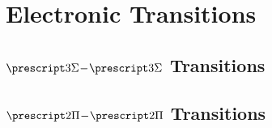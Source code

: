 \chapter{Electronic Transitions}
\label{c:electronic_transitions}

\section{\texorpdfstring{$\state{3}{\Sigma}\dash\state{3}{\Sigma}$}{3Σ-3Σ} Transitions}
\label{s:3_sigma_to_3_sigma_transitions}

\section{\texorpdfstring{$\state{2}{\Pi}\dash\state{2}{\Pi}$}{2Π-2Π} Transitions}
\label{s:2_pi_to_2_pi_transitions}
